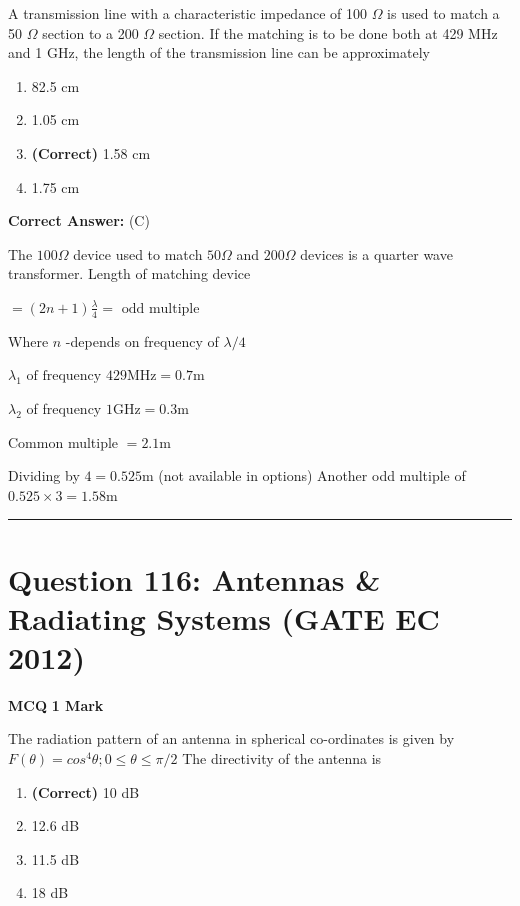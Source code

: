 \documentclass[11pt,a4paper]{article}
\begin{document}
\noindent A transmission line with a characteristic impedance of 100 $\Omega$ is used to match a 50 $\Omega$ section to a 200 $\Omega$ section. If the matching is to be done both at 429 MHz and 1 GHz, the length of the transmission line can be approximately


\begin{enumerate}[label=(\Alph*)]
    \item 82.5 cm
    \item 1.05 cm
    \item \textbf{(Correct)} 1.58 cm
    \item 1.75 cm
\end{enumerate}

\noindent \textbf{Correct Answer:} (C)

\begin{tcolorbox}[solbox, title=Detailed Solution -- Question 115]
The $100 \Omega$ device used to match $50 \Omega$ and $200 \Omega$ devices is a quarter wave transformer. 
Length of matching device

$=(2 n+1) \frac{\lambda}{4}=\text { odd multiple }$

Where $n$ -depends on frequency of $\lambda / 4$

$\lambda_{1} \text { of frequency } 429 \mathrm{MHz}=0.7 \mathrm{m}$

$\lambda_{2}$ of frequency $1 \mathrm{GHz}=0.3 \mathrm{m}$

Common multiple $=2.1 \mathrm{m}$

Dividing by $4=0.525 \mathrm{m}$ (not available in options) 
Another odd multiple of $0.525 \times 3=1.58 \mathrm{m}$
\end{tcolorbox}

\vspace{1.5em}
\hrule
\vspace{1.5em}

\section*{Question 116: Antennas \& Radiating Systems (GATE EC 2012)}
\noindent \textbf{\color{primary}MCQ} \hfill \textbf{\color{secondary}1 Mark}


\noindent The radiation pattern of an antenna in spherical co-ordinates is given by 
 $F(\theta )=cos^{4}\theta ;0\leq \theta\leq \pi /2$ 
The directivity of the antenna is


\begin{enumerate}[label=(\Alph*)]
    \item \textbf{(Correct)} 10 dB
    \item 12.6 dB
    \item 11.5 dB
    \item 18 dB
\end{enumerate}
\end{document}
